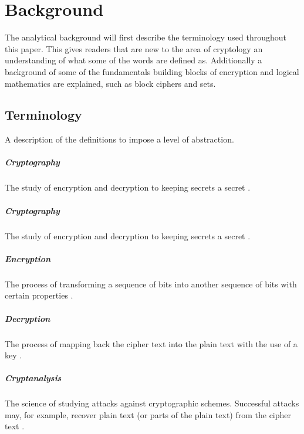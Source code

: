 \documentclass[11pt,a4paper, notitlepage]{report}
\begin{document}
\chapter{Background}
\label{cha:AnBack}

The analytical background will first describe the terminology used throughout this paper. This gives readers that are new to the area of cryptology an understanding of what some of the words are defined as. Additionally a background of some of the fundamentals building blocks of encryption and logical mathematics are explained, such as block ciphers and sets. 


\section{Terminology}
\label{sec:Term}

A description of the definitions to impose a level of abstraction.

\paragraph{Cryptography}
The study of encryption and decryption to keeping secrets a secret \cite{DBLP:series/isc/DelfsK07}.

\paragraph{Cryptography}
The study of encryption and decryption to keeping secrets a secret \cite{DBLP:series/isc/DelfsK07}.

\paragraph{Encryption}
The process of transforming a sequence of bits into another sequence of bits with certain properties \cite{Fabio2000LogicalSAT}.

\paragraph{Decryption}
The process of mapping back the cipher text into the plain text with the use of a key \cite{Fabio2000LogicalSAT}.

\paragraph{Cryptanalysis}
The science of studying attacks against cryptographic schemes. Successful attacks may, for example, recover plain text (or parts of the plain text) from the cipher text \cite{DBLP:books/sp/Buchmann02}.
\end{document}
